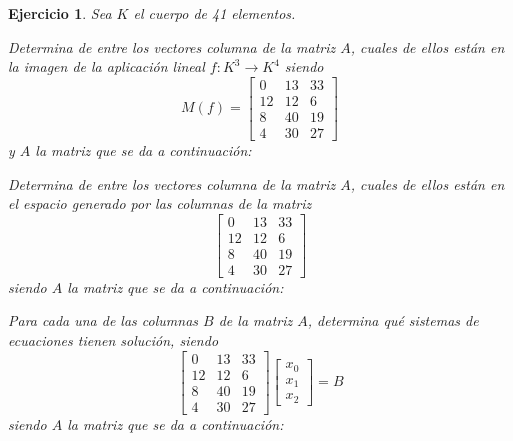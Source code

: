 \documentclass[12pt]{amsart}
\newtheorem{ejer}{Ejercicio}
\begin{document}
\begin{ejer} Sea $K$ el cuerpo de 41 elementos.
\newline
\noindent\begin{minipage}{\textwidth}
\begin{tcolorbox}[colback = green!20!white,title=Versión Núcleo]
Determina de entre los vectores columna de la matriz $A$, cuales de ellos están en la imagen de la aplicación lineal $f:K^{3} \to K^{4}$ siendo  $$ M(f) = \left[\begin{array}{rrr}
0 & 13 & 33 \\
12 & 12 & 6 \\
8 & 40 & 19 \\
4 & 30 & 27
\end{array}\right] $$ y $A$ la matriz que se da a continuación:\end{tcolorbox}
\end{minipage} \newline
\noindent\begin{minipage}{\textwidth}
\begin{tcolorbox}[colback = blue!20!white,title=Versión Anulador]
Determina de entre los vectores columna de la matriz $A$, cuales de ellos están en el espacio generado por las columnas de la matriz $$ \left[\begin{array}{rrr}
0 & 13 & 33 \\
12 & 12 & 6 \\
8 & 40 & 19 \\
4 & 30 & 27
\end{array}\right] $$ siendo $A$ la matriz que se da a continuación:\end{tcolorbox}
\end{minipage} \newline
\noindent\begin{minipage}{\textwidth} 
\begin{tcolorbox}[colback = red!20!white,title=Versión Ecuaciones Implícitas]
Para cada una de las columnas $B$ de la matriz $A$, determina qué sistemas de ecuaciones tienen solución, siendo $$ \left[\begin{array}{rrr}
0 & 13 & 33 \\
12 & 12 & 6 \\
8 & 40 & 19 \\
4 & 30 & 27
\end{array}\right] \left[\begin{array}{r}
x_{0} \\
x_{1} \\
x_{2}
\end{array}\right] = B$$ siendo $A$ la matriz que se da a continuación:

\end{tcolorbox}
\end{minipage}
\end{ejer}
\end{document}
